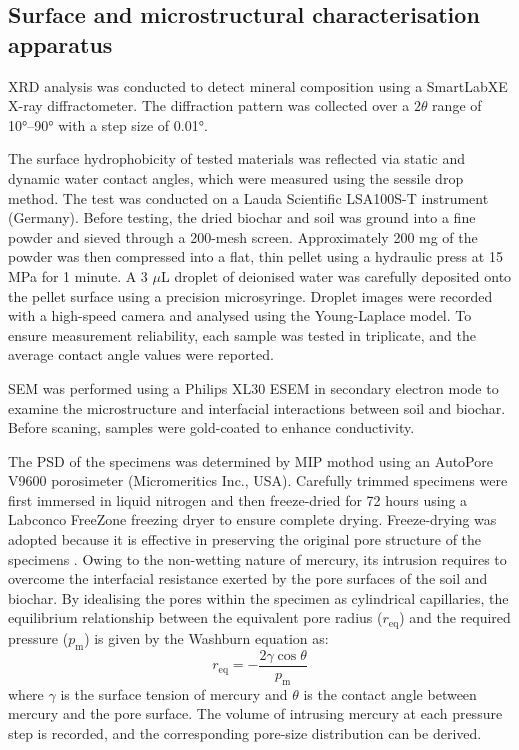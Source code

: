 \subsection{Surface and microstructural characterisation apparatus}
\Ac{XRD} analysis was conducted to detect mineral composition using a SmartLabXE X-ray diffractometer. The diffraction pattern was collected over a \(2\theta\) range of \ang{10}--\ang{90} with a step size of \ang{0.01}.\par
The surface hydrophobicity of tested materials was reflected via static and dynamic water contact angles, which were measured using the sessile drop method. The test was conducted on a Lauda Scientific LSA100S-T instrument (Germany). Before testing, the dried biochar and soil was ground into a fine powder and sieved through a 200-mesh screen. Approximately 200 mg of the powder was then compressed into a flat, thin pellet using a hydraulic press at 15 MPa for 1 minute. A 3 $\mu$L droplet of deionised water was carefully deposited onto the pellet surface using a precision microsyringe. Droplet images were recorded with a high-speed camera and analysed using the Young-Laplace model. To ensure measurement reliability, each sample was tested in triplicate, and the average contact angle values were reported. \par
\Ac{SEM} was performed using a Philips XL30 ESEM in secondary electron mode to examine the microstructure and interfacial interactions between soil and biochar. Before scaning, samples were gold-coated to enhance conductivity.\par
The \ac{PSD} of the specimens was determined by \ac{MIP} mothod using an AutoPore V9600 porosimeter (Micromeritics Inc., USA). Carefully trimmed specimens were first immersed in liquid nitrogen and then freeze-dried for 72 hours using a Labconco FreeZone freezing dryer to ensure complete drying. Freeze-drying was adopted because it is effective in preserving the original pore structure of the specimens \parencite{ngEffectsPoreStructure2023}. Owing to the non-wetting nature of mercury, its intrusion requires to overcome the interfacial resistance exerted by the pore surfaces of the soil and biochar. By idealising the pores within the specimen as cylindrical capillaries, the equilibrium relationship between the equivalent pore radius ($r_{\mathrm{eq}}$) and the required pressure ($p_{\mathrm{m}}$) is given by the Washburn equation as:
\begin{equation}
    r_{\mathrm{eq}} = -\frac{2\gamma \cos \theta}{p_{\mathrm{m}}}
\end{equation}
where $\gamma$ is the surface tension of mercury and $\theta$ is the contact angle between mercury and the pore surface. The volume of intrusing mercury at each pressure step is recorded, and the corresponding pore-size distribution can be derived. \par

